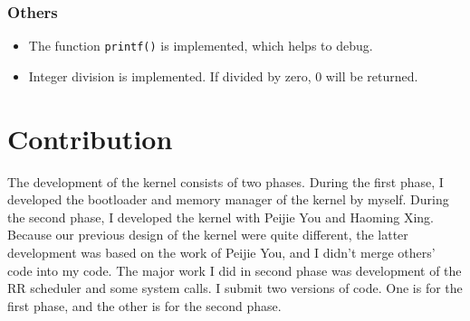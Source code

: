 \documentclass[12pt, a4paper]{article}
\begin{document}
\subsubsection{Others}
\begin{itemize}
	\item The function \verb|printf()| is implemented, which helps to debug.
	\item Integer division is implemented. If divided by zero, 0 will be returned.
\end{itemize}

\section{Contribution}
The development of the kernel consists of two phases. During the first phase, I developed the bootloader and memory manager of the kernel  by myself. During the second phase, I developed the kernel with Peijie You and Haoming Xing. Because our previous design of the kernel were quite different, the latter development was based on the work of Peijie You, and I didn't merge others' code into my code. The major work I did in second phase was development of the RR scheduler and some system calls. I submit two versions of code. One is for the first phase, and the other is for the second phase.
\end{document}

